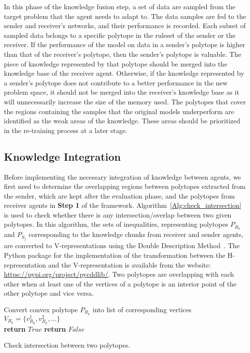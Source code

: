 \documentclass[lettersize,journal]{IEEEtran}
\begin{document}
In this phase of the knowledge fusion step, a set of data are sampled from the target problem that the agent needs to adapt to. The data samples are fed to the sender and receiver\textquoteright s networks, and their performance is recorded. Each subset of sampled data belongs to a specific polytope in the ruleset of the sender or the receiver. If the performance of the model on data in a sender\textquoteright s polytope is higher than that of the receiver\textquoteright s polytope, then the sender\textquoteright s polytope is valuable. The piece of knowledge represented by that polytope should be merged into the knowledge base of the receiver agent. Otherwise, if the knowledge represented by a sender\textquoteright s polytope does not contribute to a better performance in the new problem space, it should not be merged into the receiver\textquoteright s knowledge base as it will unnecessarily increase the size of the memory used. The polytopes that cover the regions containing the samples that the original models underperform are identified as the weak areas of the knowledge. These areas should be prioritized in the re-training process at a later stage.


\subsection{Knowledge Integration}\label{jpaper2-methodology-fusion-transfer}
Before implementing the necessary integration of knowledge between agents, we first need to determine the overlapping regions between polytopes extracted from the sender, which are kept after the evaluation phase, and the polytopes from receiver agents in \textbf{Step 1} of the framework.  Algorithm~\ref{Alg:check_intersection} is used to check whether there is any intersection/overlap between two given polytopes. In this algorithm, the sets of inequalities, representing polytopes $P_{R_k}$ and $P_{S_j}$ corresponding to the knowledge chunks from receiver and sender agents, are converted to V-representations using the Double Description Method~\cite{motzkin20163}. The Python package for the implementation of the transformation between the H-representation and the V-representation is available from the website: \url{https://pypi.org/project/pycddlib/}.
Two polytopes are overlapping with each other when at least one of the vertices of a polytope is an interior point of the other polytope and vice versa.


\begin{algorithm}[!t]
\footnotesize
{}

Convert convex polytope $P_{R_k}$ into list of corresponding vertices $V_{R_k}=\{v_{R_k}^1,v_{R_k}^2,...\}$  \\
{
	\textbf{return} $True$
}
\Else
{
	\textbf{return} $False$
}

\caption{Check intersection between two polytopes.}\label{Alg:check_intersection}
\end{algorithm}
\end{document}
